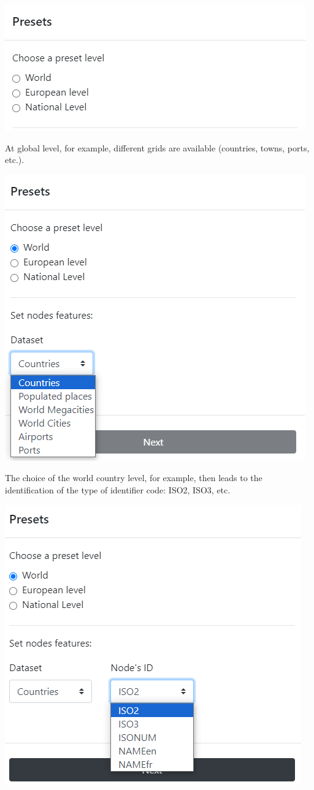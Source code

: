 \documentclass[
  letterpaper,
  DIV=11,
  numbers=noendperiod]{scrreprt}
\begin{document}
\includegraphics{images/Preset.PNG}

At global level, for example, different grids are available (countries,
towns, ports, etc.).

\includegraphics{images/Preset_world_countries.png}

The choice of the world country level, for example, then leads to the
identification of the type of identifier code: ISO2, ISO3, etc.

\includegraphics{images/Preset_world_countries_iso.png}
\end{document}
